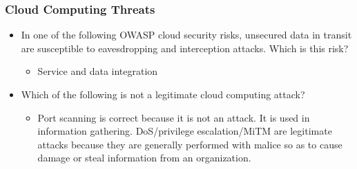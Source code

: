 \subsubsection{Cloud Computing Threats}
\begin{itemize}
    \item In one of the following OWASP cloud security risks, unsecured data in transit are susceptible to eavesdropping and interception attacks. Which is this risk?
    \begin{itemize}
        \item Service and data integration
    \end{itemize}
    \item Which of the following is not a legitimate cloud computing attack?
    \begin{itemize}
        \item Port scanning is correct because it is not an attack. It is used in information gathering. DoS/privilege escalation/MiTM are legitimate attacks because they are generally performed with malice so as to cause damage or steal information from an organization.
    \end{itemize}
\end{itemize}
